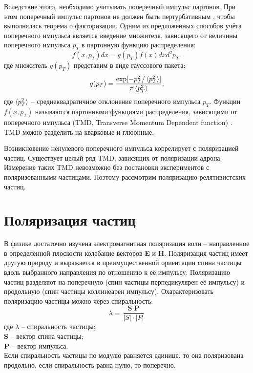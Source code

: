 \documentclass{extreport}
\begin{document}
Вследствие этого, необходимо учитывать поперечный импульс партонов. При этом поперечный импульс партонов не должен быть пертурбативным \cite{Lewis_2020}, чтобы выполнялась теорема о факторизации. Одним из предложенных способов учёта поперечного импульса является введение множителя, зависящего от величины поперечного импульса $p_{T}$ в партонную функцию распределения:
\begin{equation}
	f(x, p_{T})dx =g(p_{T}) f(x) dx d^2p_{T},
\end{equation}
где множитель $g(p_{T})$ представим в виде гауссового пакета:
\begin{equation}
	g(p_{T}) = \frac{\exp [-p^2_{T} / \braket{p^2_T}]}{\pi \braket{p^2_T}},
\end{equation}
где $\braket{p^2_T}$ -- среднеквадратичное отклонение поперечного импульса $p_T$.
Функции $f(x, p_{T})$ называются партонными функциями распределения, зависящими от поперечного импульса (TMD, Transverse Momentum Dependent function) \cite{Arbuzov_2020}. TMD можно разделить на кварковые и глюонные. 

Возникновение ненулевого поперечного импульса коррелирует с поляризацией частиц. Существует целый ряд TMD, зависящих от поляризации адрона. Измерение таких TMD невозможно без постановки экспериментов с поляризованными частицами. Поэтому рассмотрим поляризацию релятивистских частиц.

\section{Поляризация частиц}

 В физике достаточно изучена электромагнитная поляризация волн – направленное в определённой плоскости колебание векторов \textbf{E} и \textbf{H}. Поляризация частиц имеет другую природу и выражается в преимущественной ориентации спина частицы вдоль выбранного направления по отношению к её импульсу. Поляризацию частиц разделяют на поперечную (спин частицы перпедикулярен её импульсу) и продольную (спин частицы коллинеарен импульсу). 
 Охарактеризовать поляризацию частицы можно через спиральность:
 \begin{equation}
     \lambda = \frac{\textbf{S} \cdot \textbf{P}}{|S|\cdot |P|}
 \end{equation}
где $\lambda$ -- спиральность частицы; \\ \textbf{S} – вектор спина частицы; \\ \textbf{P} – вектор импульса. \\ 
Если спиральность частицы по модулю равняется единице, то она поляризована продольно, если спиральность равна нулю, то поперечно. 
\end{document}
